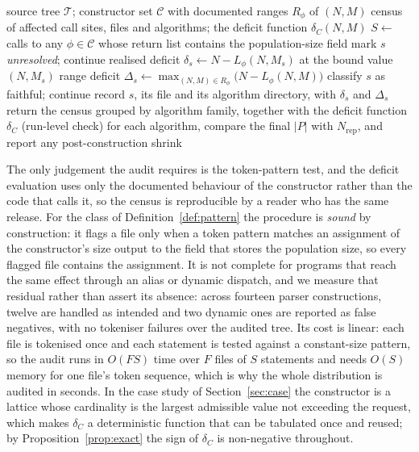 \documentclass{SCIS2026}
\begin{document}
\begin{algorithm}
\footnotesize
\caption{Auditing a library for population-size infidelity}
\label{alg:audit}
\begin{algorithmic}[1]
    \REQUIRE source tree $\mathcal{T}$; constructor set $\mathcal{C}$ with documented ranges $R_\phi$ of $(N,M)$
    \ENSURE census of affected call sites, files and algorithms; the deficit function $\delta_C(N,M)$
    \STATE $S \gets$ calls to any $\phi \in \mathcal{C}$ whose return list contains the population-size field
            \STATE mark $s$ \emph{unresolved}; continue
        \ENDIF
        \STATE realised deficit $\delta_s \gets N - L_\phi(N,M_s)$ at the bound value $(N,M_s)$
        \STATE range deficit $\Delta_s \gets \max_{(N,M)\in R_\phi}\big(N - L_\phi(N,M)\big)$
            \STATE classify $s$ as faithful; continue
        \ENDIF
        \STATE record $s$, its file and its algorithm directory, with $\delta_s$ and $\Delta_s$
    \ENDFOR
    \STATE return the census grouped by algorithm family, together with the deficit function $\delta_C$
\STATE (run-level check) for each algorithm, compare the final $|P|$ with $N_{\mathrm{rep}}$, and report any post-construction shrink
\end{algorithmic}
\end{algorithm}

The only judgement the audit requires is the token-pattern test, and the deficit evaluation uses only the documented behaviour of the constructor rather than the code that calls it, so the census is reproducible by a reader who has the same release. For the class of Definition~\ref{def:pattern} the procedure is \emph{sound} by construction: it flags a file only when a token pattern matches an assignment of the constructor's size output to the field that stores the population size, so every flagged file contains the assignment. It is not complete for programs that reach the same effect through an alias or dynamic dispatch, and we measure that residual rather than assert its absence: across fourteen parser constructions, twelve are handled as intended and two dynamic ones are reported as false negatives, with no tokeniser failures over the audited tree. Its cost is linear: each file is tokenised once and each statement is tested against a constant-size pattern, so the audit runs in $O(FS)$ time over $F$ files of $S$ statements and needs $O(S)$ memory for one file's token sequence, which is why the whole distribution is audited in seconds. In the case study of Section~\ref{sec:case} the constructor is a lattice whose cardinality is the largest admissible value not exceeding the request, which makes $\delta_C$ a deterministic function that can be tabulated once and reused; by Proposition~\ref{prop:exact} the sign of $\delta_C$ is non-negative throughout.
\end{document}
